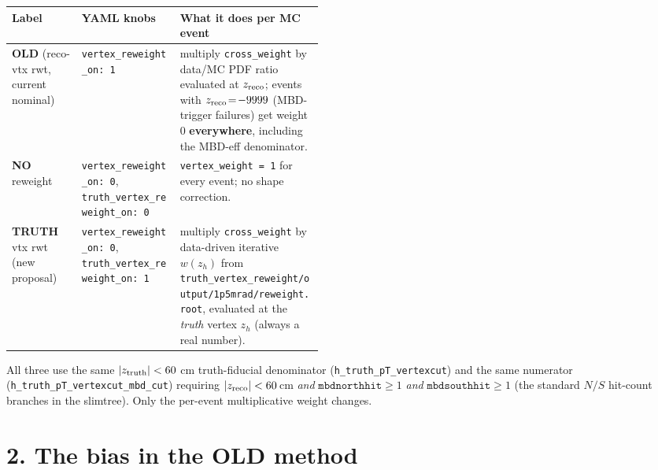 \documentclass[11pt,a4paper]{article}
\begin{document}
\begin{table}[H]
\centering\small
\begin{tabular}{llp{0.46\linewidth}}
\toprule
Label & YAML knobs & What it does per MC event\\
\midrule
\textbf{OLD} (reco-vtx rwt, current nominal) & \texttt{vertex\_reweight\_on: 1} & multiply \texttt{cross\_weight} by data/MC PDF ratio evaluated at $z_{\rm reco}$; events with $z_{\rm reco}\!=\!-9999$ (MBD-trigger failures) get weight 0 \textbf{everywhere}, including the MBD-eff denominator.\\
\textbf{NO} reweight & \texttt{vertex\_reweight\_on: 0}, \texttt{truth\_vertex\_reweight\_on: 0} & \texttt{vertex\_weight = 1} for every event; no shape correction.\\
\textbf{TRUTH} vtx rwt (new proposal) & \texttt{vertex\_reweight\_on: 0}, \texttt{truth\_vertex\_reweight\_on: 1} & multiply \texttt{cross\_weight} by data-driven iterative $w(z_h)$ from \texttt{truth\_vertex\_reweight/output/1p5mrad/reweight.root}, evaluated at the \emph{truth} vertex $z_h$ (always a real number).\\
\bottomrule
\end{tabular}
\end{table}

All three use the same $|z_{\rm truth}|<60$ cm truth-fiducial denominator (\texttt{h\_truth\_pT\_vertexcut}) and the same numerator (\texttt{h\_truth\_pT\_vertexcut\_mbd\_cut}) requiring $|z_{\rm reco}|<60$\,cm \emph{and} $\texttt{mbdnorthhit}\ge 1$ \emph{and} $\texttt{mbdsouthhit}\ge 1$ (the standard $N/S$ hit-count branches in the slimtree). Only the per-event multiplicative weight changes.

\section*{2. The bias in the OLD method}
\end{document}
